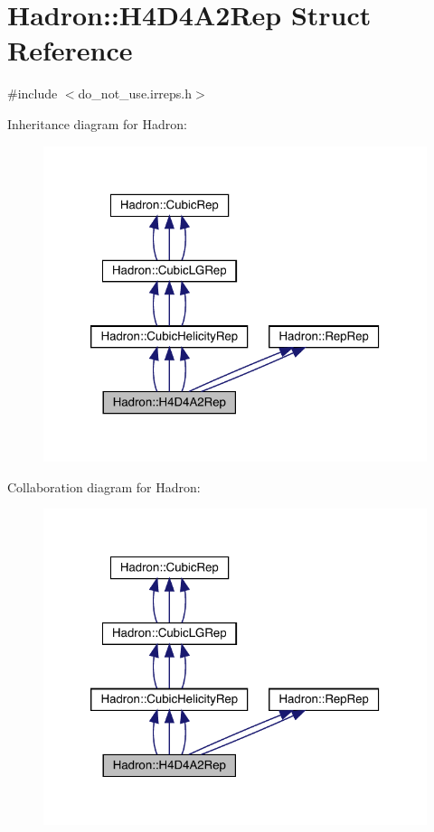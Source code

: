 \hypertarget{structHadron_1_1H4D4A2Rep}{}\section{Hadron\+:\+:H4\+D4\+A2\+Rep Struct Reference}
\label{structHadron_1_1H4D4A2Rep}


{\ttfamily \#include $<$do\+\_\+not\+\_\+use.\+irreps.\+h$>$}



Inheritance diagram for Hadron\+:
\nopagebreak
\begin{figure}[H]
\begin{center}
\leavevmode
\includegraphics[width=320pt]{d0/d9c/structHadron_1_1H4D4A2Rep__inherit__graph}
\end{center}
\end{figure}


Collaboration diagram for Hadron\+:
\nopagebreak
\begin{figure}[H]
\begin{center}
\leavevmode
\includegraphics[width=320pt]{d3/d30/structHadron_1_1H4D4A2Rep__coll__graph}
\end{center}
\end{figure}
